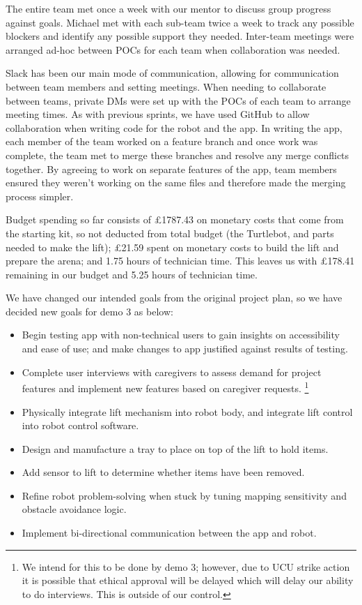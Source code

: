 \documentclass{article}
\begin{document}
The entire team met once a week with our mentor to discuss group progress against goals. Michael met with each sub-team twice a week to track any possible blockers and identify any possible support they needed. Inter-team meetings were arranged ad-hoc between POCs for each team when collaboration was needed. 

Slack has been our main mode of communication, allowing for communication between team members and setting meetings. When needing to collaborate between teams, private DMs were set up with the POCs of each team to arrange meeting times. As with previous sprints, we have used GitHub to allow collaboration when writing code for the robot and the app. In writing the app, each member of the team worked on a feature branch and once work was complete, the team met to merge these branches and resolve any merge conflicts together. By agreeing to work on separate features of the app, team members ensured they weren't working on the same files and therefore made the merging process simpler. 

Budget spending so far consists of \pounds 1787.43 on monetary costs that come from the starting kit, so not deducted from total budget (the Turtlebot, and parts needed to make the lift); \pounds 21.59 spent on monetary costs to build the lift and prepare the arena; and 1.75 hours of technician time. This leaves us with \pounds 178.41 remaining in our budget and 5.25 hours of technician time. 

We have changed our intended goals from the original project plan, so we have decided new goals for demo 3 as below:
\begin{itemize}
\item Begin testing app with non-technical users to gain insights on accessibility and ease of use; and make changes to app justified against results of testing.
\item Complete user interviews with caregivers to assess demand for project features and implement new features based on caregiver requests. \footnote{We intend for this to be done by demo 3; however, due to UCU strike action it is possible that ethical approval will be delayed which will delay our ability to do interviews. This is outside of our control.}
\item Physically integrate lift mechanism into robot body, and integrate lift control into robot control software.
\item Design and manufacture a tray to place on top of the lift to hold items.
\item Add sensor to lift to determine whether items have been removed. 
\item Refine robot problem-solving when stuck by tuning mapping sensitivity and obstacle avoidance logic.
\item Implement bi-directional communication between the app and robot.
\end{itemize}
\end{document}
